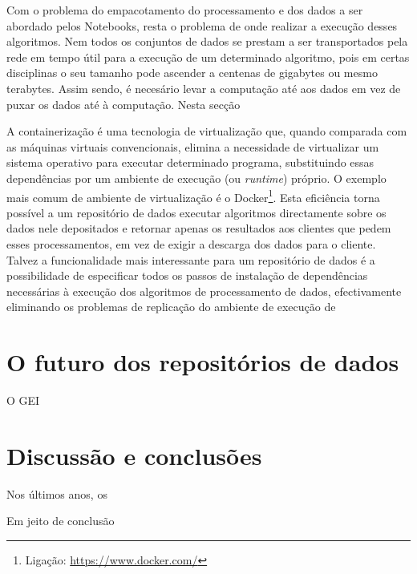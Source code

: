 \documentclass[sigconf,nonacm]{acmart}
\begin{document}
Com o problema do empacotamento do processamento e dos dados a ser abordado pelos Notebooks, resta o problema de onde realizar a execução desses algoritmos. Nem todos os conjuntos de dados se prestam a ser transportados pela rede em tempo útil para a execução de um determinado algoritmo, pois em certas disciplinas o seu tamanho pode ascender a centenas de gigabytes ou mesmo terabytes. Assim sendo, é necesário levar a computação até aos dados em vez de puxar os dados até à computação. Nesta secção

A containerização é uma tecnologia de virtualização que, quando comparada com as máquinas virtuais convencionais, elimina a necessidade de virtualizar um sistema operativo para executar determinado programa, substituindo essas dependências por um ambiente de execução (ou \textit{runtime}) próprio. O exemplo mais comum de ambiente de virtualização é o Docker\footnote{Ligação: \url{https://www.docker.com/}}. Esta eficiência torna possível a um repositório de dados executar algoritmos directamente sobre os dados nele depositados e retornar apenas os resultados aos clientes que pedem esses processamentos, em vez de exigir a descarga dos dados para o cliente. Talvez a funcionalidade mais interessante para um repositório de dados é a possibilidade de especificar todos os passos de instalação de dependências necessárias à execução dos algoritmos de processamento de dados, efectivamente eliminando os problemas de replicação do ambiente de execução de 

\section{O futuro dos repositórios de dados}

O GEI 

\section{Discussão e conclusões}

Nos últimos anos, os 

Em jeito de conclusão





\end{document}
